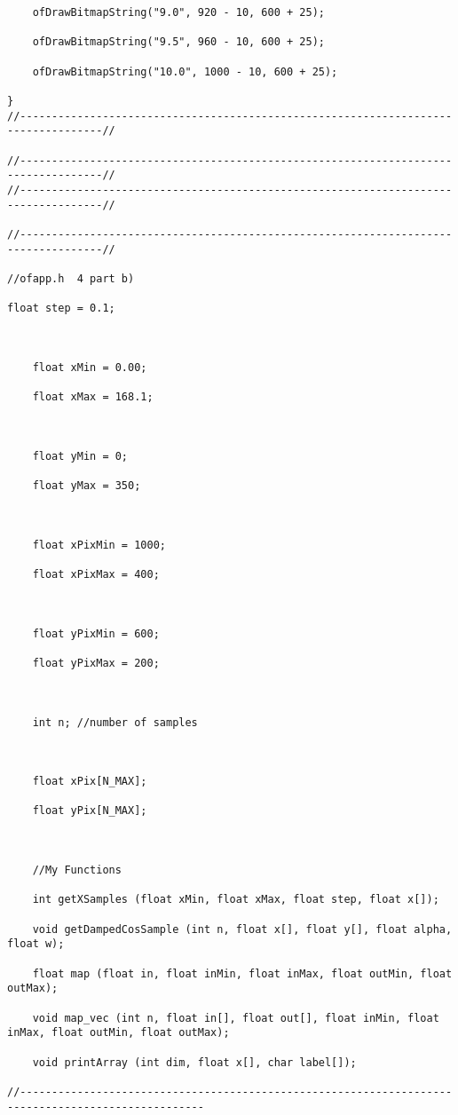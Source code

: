 \documentclass[letterpaper, 24pt, final, onecolumn, titlepage] {article}
\begin{document}
\begin{lstlisting}
    ofDrawBitmapString("9.0", 920 - 10, 600 + 25);

    ofDrawBitmapString("9.5", 960 - 10, 600 + 25);

    ofDrawBitmapString("10.0", 1000 - 10, 600 + 25);

}
//-----------------------------------------------------------------------------------//

//-----------------------------------------------------------------------------------//
//-----------------------------------------------------------------------------------//

//-----------------------------------------------------------------------------------//

//ofapp.h  4 part b)

float step = 0.1;



    float xMin = 0.00;

    float xMax = 168.1;



    float yMin = 0;

    float yMax = 350;



    float xPixMin = 1000;

    float xPixMax = 400;



    float yPixMin = 600;

    float yPixMax = 200;



    int n; //number of samples



    float xPix[N_MAX];

    float yPix[N_MAX];



    //My Functions

    int getXSamples (float xMin, float xMax, float step, float x[]);

    void getDampedCosSample (int n, float x[], float y[], float alpha, float w);

    float map (float in, float inMin, float inMax, float outMin, float outMax);

    void map_vec (int n, float in[], float out[], float inMin, float inMax, float outMin, float outMax);

    void printArray (int dim, float x[], char label[]);

//---------------------------------------------------------------------------------------------------


\end{lstlisting}
\end{document}
